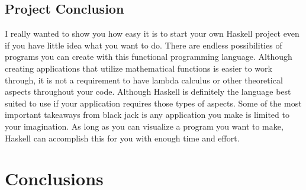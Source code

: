 \documentclass{article}
\begin{document}
    \subsection{Project Conclusion}
    I really wanted to show you how easy it is to start your own Haskell project even if you have little idea what you want to do. There are endless possibilities of programs you can create with this functional programming language. Although creating applications that utilize mathematical functions is easier to work through, it is not a requirement to have lambda calculus or other theoretical aspects throughout your code. Although Haskell is definitely the language best suited to use if your application requires those types of aspects. Some of the most important takeaways from black jack is any application you make is limited to your imagination. As long as you can visualize a program you want to make, Haskell can accomplish this for you with enough time and effort. 
    
\section{Conclusions}\label{conclusions}
\end{document}
